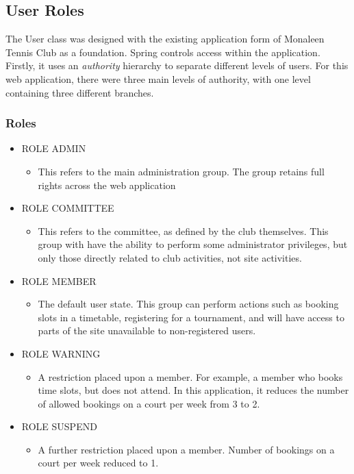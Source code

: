 \subsection{User Roles}

The User class was designed with the existing application form of Monaleen Tennis Club as a foundation. 
Spring controls access within the application. Firstly, it uses an \textit{authority} hierarchy to separate different levels of users. For this web application, there were three main levels of authority, with one level containing three different branches.

\subsubsection{Roles}
\begin{itemize}
\item ROLE ADMIN
\begin{itemize}
\item This refers to the main administration group. The group retains full rights across the web application
\end{itemize}
\item ROLE COMMITTEE
\begin{itemize}
\item This refers to the committee, as defined by the club themselves. This group with have the ability to perform some administrator privileges, but only those directly related to club activities, not site activities.
\end{itemize}
\item ROLE MEMBER
\begin{itemize}
\item The default user state. This group can perform actions such as booking slots in a timetable, registering for a tournament, and will have access to parts of the site unavailable to non-registered users.
\end{itemize}
\item ROLE WARNING 
\begin{itemize}
\item A restriction placed upon a member. For example, a member who books time slots, but does not attend. In this application, it reduces the number of allowed bookings on a court per week from 3 to 2.
\end{itemize}
\item ROLE SUSPEND
\begin{itemize}
\item A further restriction placed upon a member. Number of bookings on a court per week reduced to 1.
\end{itemize}
\end{itemize}
\label{fig:secRoles}


